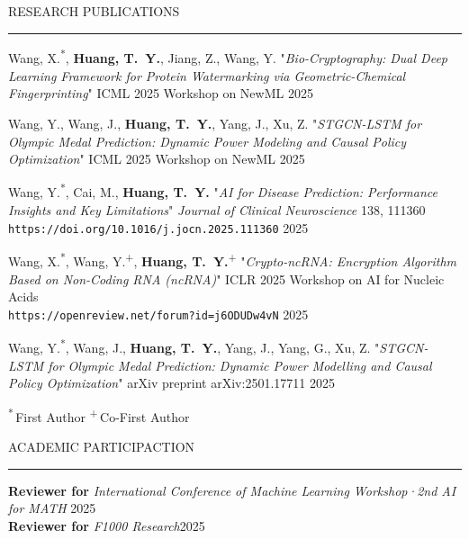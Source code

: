 \documentclass{resume} %
\renewenvironment{rSection}[1]{
\sectionskip
\textcolor{TsinghuaPurple}{\MakeUppercase{#1}}
\sectionlineskip
\hrule
\begin{list}{}{
\setlength{\leftmargin}{0em}
}
\item[]
}{
\end{list}
}
\begin{document}
\begin{rSection}{Research Publications}\itemsep -3pt         

{Wang, X.\textsuperscript{*}, \textbf{Huang, T.~Y.}, Jiang, Z., Wang, Y.  
"\textit{Bio\mbox{-}Cryptography: Dual Deep Learning Framework for Protein Watermarking via Geometric\mbox{-}Chemical Fingerprinting}"  
ICML 2025 Workshop on NewML} \hfill 2025 

{Wang, Y., Wang, J., \textbf{Huang, T.~Y.}, Yang, J., Xu, Z.  
"\textit{STGCN\mbox{-}LSTM for Olympic Medal Prediction: Dynamic Power Modeling and Causal Policy Optimization}"  
ICML 2025 Workshop on NewML} \hfill 2025 

{Wang, Y.\textsuperscript{*}, Cai, M., \textbf{Huang, T.~Y.}  
"\textit{AI for Disease Prediction: Performance Insights and Key Limitations}"  
\textit{Journal of Clinical Neuroscience} 138, 111360}\\
\texttt{https://doi.org/10.1016/j.jocn.2025.111360} \hfill 2025 

{Wang, X.\textsuperscript{*}, Wang, Y.\textsuperscript{+}, \textbf{Huang, T.~Y.}\textsuperscript{+}  
"\textit{Crypto\mbox{-}ncRNA: Encryption Algorithm Based on Non\mbox{-}Coding RNA (ncRNA)}"  
ICLR 2025 Workshop on AI for Nucleic Acids}\\
\texttt{https://openreview.net/forum?id=j6ODUDw4vN} \hfill 2025 

{Wang, Y.\textsuperscript{*}, Wang, J., \textbf{Huang, T.~Y.}, Yang, J., Yang, G., Xu, Z.  
"\textit{STGCN\mbox{-}LSTM for Olympic Medal Prediction: Dynamic Power Modelling and Causal Policy Optimization}"  
arXiv preprint arXiv:2501.17711} \hfill 2025 

\end{rSection}
{\footnotesize \textsuperscript{*}\,First Author \quad \textsuperscript{+}\,Co-First Author}

\begin{rSection}{ACADEMIC PARTICIPACTION}\itemsep -3pt

{\bf Reviewer for} \textit{International Conference of Machine Learning Workshop·2nd AI for MATH} \hfill 2025\\
{\bf Reviewer for} \textit{F1000 Research}\hfill 2025
\end{rSection}
\end{document}
